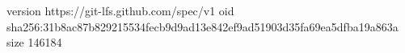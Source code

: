version https://git-lfs.github.com/spec/v1
oid sha256:31b8ac87b829215534fecb9d9ad13e842ef9ad51903d35fa69ea5dfba19a863a
size 146184
